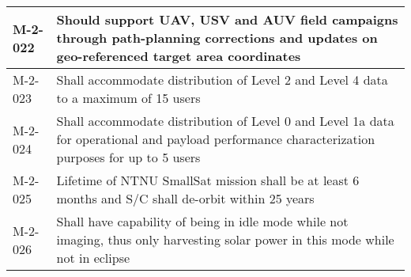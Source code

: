 \begin{table*}[htbp]
\begin{tabular}{l p{15cm}}
		\hline
		M-2-022  & Should support UAV, USV and AUV field campaigns through path-planning corrections and updates on geo-referenced target area coordinates \\ 
			\hline
		M-2-023  & Shall accommodate distribution of Level 2 and Level 4 data to a maximum of 15 users \\ 
			\hline
		M-2-024  & Shall accommodate distribution of Level 0 and Level 1a data for operational and payload performance characterization purposes for up to 5 users  \\ 
		\hline
		M-2-025  & Lifetime of NTNU SmallSat mission shall be at least 6 months and S/C shall de-orbit within 25 years   \\
			\hline
					M-2-026 & Shall have capability of being in idle mode while not imaging, thus only harvesting solar power in this mode while not in eclipse \\
			\hline
		\end{tabular}
\end{table*}

